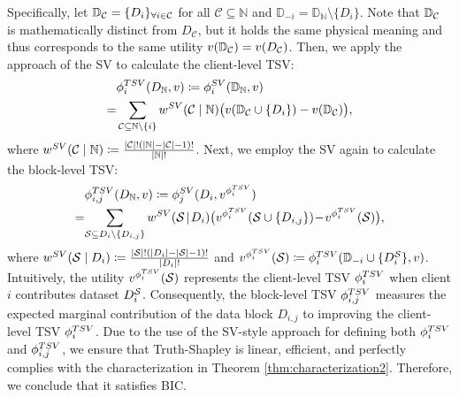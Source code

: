 Specifically, let $\mathbb{D}_{\mathcal{C}} = \{D_i\}_{\forall i \in \mathcal{C}}$ for all $\mathcal{C} \subseteq \mathbb{N}$ and $\mathbb{D}_{-i} = \mathbb{D}_{\mathbb{N}} \setminus \{D_i\}$.
Note that $\mathbb{D}_{\mathcal{C}}$ is mathematically distinct from $D_{\mathcal{C}}$, but it holds the same physical meaning and thus corresponds to the same utility $v(\mathbb{D}_{\mathcal{C}}) = v(D_{\mathcal{C}})$.
Then, we apply the approach of the SV to calculate the client-level TSV:
\begin{align*}
    &\phi^{TSV}_i(D_{\mathbb{N}}, v) \coloneqq \phi^{SV}_i(\mathbb{D}_{\mathbb{N}}, v)\\
    = & \sum_{\mathcal{C} \subseteq \mathbb{N} \setminus \{i\}} w^{SV}(\mathcal{C} \mid \mathbb{N})\big(v(\mathbb{D}_{\mathcal{C}} \cup \{D_i\}) - v(\mathbb{D}_{\mathcal{C}})\big),
\end{align*}
where $w^{SV}(\mathcal{C} \mid \mathbb{N}) \coloneqq  \frac{|\mathcal{C}|!(|\mathbb{N}|- |\mathcal{C}| - 1)!}{|\mathbb{N}|!}$.
Next, we employ the SV again to calculate the block-level TSV:
\begin{align*}
    &\phi^{TSV}_{i,j}(D_{\mathbb{N}}, v) \coloneqq \phi^{SV}_j(D_i, v^{\phi^{TSV}_i})\\
    = & \! \sum_{\mathcal{S} \subseteq D_i \setminus \{D_{i,j}\}} w^{SV}(\mathcal{S} \!\mid\! D_i)\big(v^{\phi^{TSV}_i}(\mathcal{S} \cup \{D_{i,j}\}) \!-\! v^{\phi^{TSV}_i}(\mathcal{S} )\big),
\end{align*}
where $w^{SV}(\mathcal{S} \mid D_i) \coloneqq  \frac{|\mathcal{S}|!(|D_i|- |\mathcal{S}| - 1)!}{|D_i|!}$ and $v^{\phi^{TSV}_i}(\mathcal{S} )\coloneqq \phi^{TSV}_i(\mathbb{D}_{-i} \cup \{D^{\mathcal{S}}_{i}\}, v)$.
Intuitively, the utility $v^{\phi^{TSV}_i}(\mathcal{S})$ represents the client-level TSV $\phi^{TSV}_i$ when client $i$ contributes dataset $D^{\mathcal{S}}_{i}$.
Consequently, the block-level TSV $\phi^{TSV}_{i,j}$ measures the expected marginal contribution of the data block $D_{i,j}$ to improving the client-level TSV $\phi^{TSV}_i$.
Due to the use of the SV-style approach for defining both $\phi^{TSV}_i$ and $\phi^{TSV}_{i, j}$, we ensure that Truth-Shapley is linear, efficient, and perfectly complies with the characterization in Theorem \ref{thm:characterization2}.
Therefore, we conclude that it satisfies BIC.

